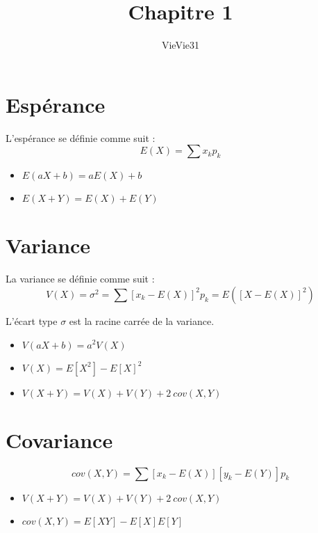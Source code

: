 \documentclass{article}
\title{Chapitre 1}
\author{VieVie31}
\begin{document}
\newtheorem{theo}{Théorème}
\newtheorem{coro}{Corollaire}

\maketitle


\section{Espérance}
L'espérance se définie comme suit :
\begin{equation}
    E(X) = \sum x_kp_k
\end{equation}

\begin{itemize}
    \item $E(aX + b) = aE(X) + b$
    \item $E(X + Y) = E(X) + E(Y)$
\end{itemize}



\section{Variance}
La variance se définie comme suit :
\begin{equation}
    V(X) = \sigma^2 = \sum[x_k-E(X)]^2p_k = E([X - E(X)]^2)
\end{equation}

L'écart type $\sigma$ est la racine carrée de la variance.

\begin{itemize}
    \item $V(aX + b) = a^2V(X)$
    \item $V(X) = E[X^2] - E[X]^2$
    \item $V(X+Y) = V(X) + V(Y) + 2\ cov(X, Y)$
\end{itemize}



\section{Covariance}
\begin{equation}
    cov(X, Y) = \sum[x_k - E(X)][y_k - E(Y)] p_k
\end{equation}

\begin{itemize}
    \item $V(X+Y) = V(X) + V(Y) + 2\ cov(X, Y)$
    \item $cov(X, Y) = E[XY] - E[X]E[Y]$
\end{itemize}
\end{document}
